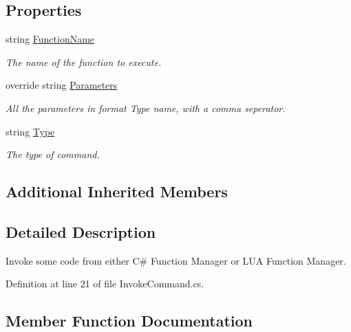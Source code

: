 \subsection*{Properties}
\begin{DoxyCompactItemize}
\item 
string \hyperlink{class_developer_console_1_1_core_1_1_invoke_command_a6611c32afd9c13054231a0240d702a2e}{Function\+Name}
\begin{DoxyCompactList}\small\item\em The name of the function to execute. \end{DoxyCompactList}\item 
override string \hyperlink{class_developer_console_1_1_core_1_1_invoke_command_a4a7d065bd008fa4534a45f9e996c9a6e}{Parameters}
\begin{DoxyCompactList}\small\item\em All the parameters in format Type name, with a comma seperator. \end{DoxyCompactList}\item 
string \hyperlink{class_developer_console_1_1_core_1_1_invoke_command_a2b8f38abe9f7892e5a18fcbec6ffb978}{Type}
\begin{DoxyCompactList}\small\item\em The type of command. \end{DoxyCompactList}\end{DoxyCompactItemize}
\subsection*{Additional Inherited Members}


\subsection{Detailed Description}
Invoke some code from either C\# Function Manager or L\+UA Function Manager. 



Definition at line 21 of file Invoke\+Command.\+cs.



\subsection{Member Function Documentation}
\mbox{\label{class_developer_console_1_1_core_1_1_invoke_command_a3c7631154759c3304ae757cbc437d27d}} 
